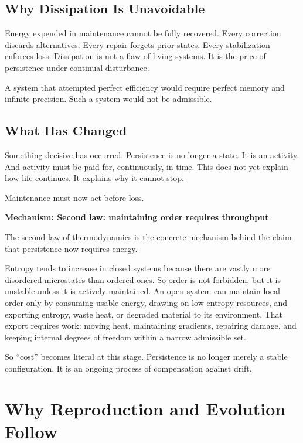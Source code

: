 \documentclass[11pt,twoside,openright]{book}
\newenvironment{mechanismbox}[1]
  {\begin{framed}\noindent\textbf{Mechanism: #1}\par\medskip}
  {\end{framed}}
\begin{document}
\section*{Why Dissipation Is Unavoidable}

Energy expended in maintenance cannot be fully recovered. Every correction discards alternatives. Every repair forgets prior states. Every stabilization enforces loss. Dissipation is not a flaw of living systems. It is the price of persistence under continual disturbance.

A system that attempted perfect efficiency would require perfect memory and infinite precision. Such a system would not be admissible.

\section*{What Has Changed}

Something decisive has occurred. Persistence is no longer a state. It is an activity. And activity must be paid for, continuously, in time. This does not yet explain how life continues. It explains why it cannot stop.

Maintenance must now act before loss.

\begin{mechanismbox}{Second law: maintaining order requires throughput}
The second law of thermodynamics is the concrete mechanism behind the claim that persistence now requires energy.

Entropy tends to increase in closed systems because there are vastly more disordered microstates than ordered ones. So order is not forbidden, but it is unstable unless it is actively maintained. An open system can maintain local order only by consuming usable energy, drawing on low-entropy resources, and exporting entropy, waste heat, or degraded material to its environment. That export requires work: moving heat, maintaining gradients, repairing damage, and keeping internal degrees of freedom within a narrow admissible set.

So ``cost'' becomes literal at this stage.
Persistence is no longer merely a stable configuration.
It is an ongoing process of compensation against drift.
\end{mechanismbox}

\chapter{Why Reproduction and Evolution Follow}
\label{ch:evolution_unavoidable}
\end{document}
